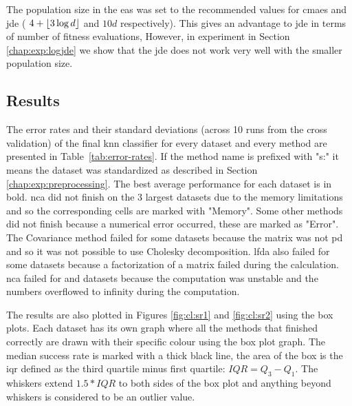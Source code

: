 \documentclass[12pt,a4paper]{report}
\begin{document}
The population size in the \acp{ea} was set to the recommended values for \ac{cmaes} and \ac{jde} ( $4+\lfloor3\log{d}\rfloor$ and $10d$ respectively). This gives an advantage to \ac{jde} in terms of number of fitness evaluations, However, in experiment in Section \ref{chap:exp:logjde} we show that the \ac{jde} does not work very well with the smaller population size.

\subsection{Results}

The error rates and their standard deviations (across 10 runs from the cross validation) of the final \ac{knn} classifier for every dataset and every method are presented in Table~\ref{tab:error-rates}. If the method name is prefixed with "s:" it means the dataset was standardized as described in Section \ref{chap:exp:preprocessing}. The best average performance for each dataset is in bold. \ac{nca} did not finish on the 3 largest datasets due to the memory limitations and so the corresponding cells are marked with "Memory". Some other methods did not finish because a numerical error occurred, these are marked as "Error". The Covariance method failed for some datasets because the matrix was not \ac{pd} and so it was not possible to use Cholesky decomposition. \ac{lfda} also failed for some datasets because a factorization of a matrix failed during the calculation. \ac{nca} failed for  and  datasets because the computation was unstable and the numbers overflowed to infinity during the computation.



The results are also plotted in Figures \ref{fig:cl:sr1} and \ref{fig:cl:sr2} using the box plots. Each dataset has its own graph where all the methods that finished correctly are drawn with their specific colour using the box plot graph. The median success rate is marked with a thick black line, the area of the box is the \ac{iqr} defined as the third quartile minus first quartile: $IQR = Q_3 - Q_1$. The whiskers extend $1.5*IQR$ to both sides of the box plot and anything beyond whiskers is considered to be an outlier value.

\end{document}
